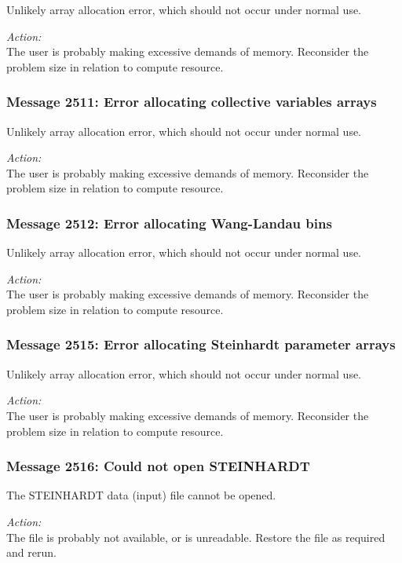 Unlikely array allocation error, which should not occur under normal use.

\noindent
{\em Action:}\\ The user is probably making excessive demands of
memory. Reconsider the problem size in relation to compute resource.
          
\subsubsection*{Message 2511: Error allocating collective variables arrays}

Unlikely array allocation error, which should not occur under normal use.

\noindent
{\em Action:}\\ The user is probably making excessive demands of
memory. Reconsider the problem size in relation to compute resource.
          
\subsubsection*{Message 2512: Error allocating Wang-Landau bins}

Unlikely array allocation error, which should not occur under normal use.

\noindent
{\em Action:}\\ The user is probably making excessive demands of
memory. Reconsider the problem size in relation to compute resource.
          
\subsubsection*{Message 2515: Error allocating Steinhardt parameter arrays}

Unlikely array allocation error, which should not occur under normal use.

\noindent
{\em Action:}\\ The user is probably making excessive demands of
memory. Reconsider the problem size in relation to compute resource.
          
\subsubsection*{Message 2516: Could not open STEINHARDT}

The STEINHARDT data (input) file cannot be opened.

\noindent
{\em Action:}\\ The file is probably not available, or is unreadable. Restore
the file as required and rerun.
          
